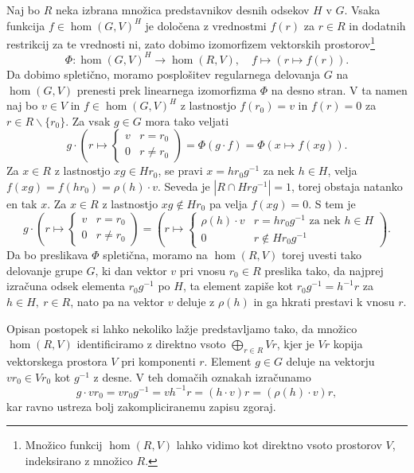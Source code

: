\documentclass[11pt]{book}
\theoremstyle{definition}
\theoremstyle{zgled}
\theoremstyle{odprtproblem}
\theoremstyle{domacanaloga}
\theoremstyle{izrek}
\begin{document}
Naj bo $R$ neka izbrana množica predstavnikov desnih odsekov $H$ v $G$. Vsaka funkcija $f \in \hom(G,V)^H$ je določena z vrednostmi $f(r)$ za $r \in R$ in dodatnih restrikcij za te vrednosti ni, zato dobimo izomorfizem vektorskih prostorov\footnote{Množico funkcij $\hom(R,V)$ lahko vidimo kot direktno vsoto prostorov $V$, indeksirano z množico $R$.}
    \[
        \Phi \colon \hom(G,V)^H \to \hom(R,V), \quad
        f \mapsto \left( r \mapsto f(r) \right).
    \]
Da dobimo spletično, moramo posplošitev regularnega delovanja $G$ na $\hom(G,V)$ prenesti prek linearnega izomorfizma $\Phi$ na desno stran. V ta namen naj bo $v \in V$ in $f \in \hom(G,V)^H$ z lastnostjo $f(r_0) = v$ in $f(r) = 0$ za $r \in R \backslash \{ r_0 \}$. Za vsak $g \in G$ mora tako veljati
    \[
        g \cdot \left( r \mapsto \begin{cases} v & r = r_0 \\ 0 & r \neq r_0 \end{cases} \right) =
        \Phi \left( g \cdot f \right) =
        \Phi \left( x \mapsto f(xg) \right).
    \]
Za $x \in R$ z lastnostjo $xg \in Hr_0$, se pravi $x = h r_0 g^{-1}$ za nek $h \in H$, velja $f(xg) = f(hr_0) = \rho(h) \cdot v$. Seveda je $|R \cap H r g^{-1}| = 1$, torej obstaja natanko en tak $x$. Za $x \in R$ z lastnostjo $xg \notin Hr_0$ pa velja $f(xg) = 0$. S tem je
    \[
        g \cdot \left( r \mapsto \begin{cases} v & r = r_0 \\ 0 & r \neq r_0 \end{cases} \right) =
        \left( r \mapsto \begin{cases} \rho(h) \cdot v & r = h r_0 g^{-1} \text{ za nek $h \in H$} \\ 0 & r \notin H r_0 g^{-1} \end{cases} \right).
    \]
Da bo preslikava $\Phi$ spletična, moramo na $\hom(R,V)$ torej uvesti tako delovanje grupe $G$, ki dan vektor $v$ pri vnosu $r_0 \in R$ preslika tako, da najprej izračuna odsek elementa $r_0 g^{-1}$ po $H$, ta element zapiše kot $r_0 g^{-1} = h^{-1} r$ za $h \in H, \ r \in R$, nato pa na vektor $v$ deluje z $\rho(h)$ in ga hkrati prestavi k vnosu $r$.
    
Opisan postopek si lahko nekoliko lažje predstavljamo tako, da množico $\hom(R,V)$ identificiramo z direktno vsoto $\bigoplus_{r \in R} V r$, kjer je $Vr$ kopija vektorskega prostora $V$ pri komponenti $r$. Element $g \in G$ deluje na vektorju $v r_0 \in Vr_0$ kot $g^{-1}$ z desne. V teh domačih oznakah izračunamo
    \[
        g \cdot v r_0 = v r_0 g^{-1} = v h^{-1} r = (h \cdot v) r = (\rho(h) \cdot v) r,
    \]
kar ravno ustreza bolj zakompliciranemu zapisu zgoraj.
\end{document}
